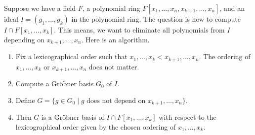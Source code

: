 Suppose we have a field $F$, a polynomial ring $F[x_1,\ldots,x_n, x_{k+1}, \ldots, x_n]$, and an ideal $I = (g_1,\ldots,g_k)$ in the polynomial ring.
The question is how to compute $I\cap F[x_1,\ldots,x_k]$.
This means, we want to eliminate all polynomials from $I$ depending on $x_{k+1},\ldots,x_n$.
Here is an algorithm.
\begin{enumerate}
\item  Fix a lexicographical order such that $x_1,\ldots,x_k < x_{k+1},\ldots,x_n$.
The ordering of $x_1,\ldots,x_k$ or $x_{k+1},\ldots,x_n$ does not matter.

\item Compute a Gr\"obner basis $G_0$ of $I$.

\item Define $G = \{g\in G_0\mid g \text{ does not depend on } x_{k+1},\ldots,x_n\}$.

\item Then $G$ is a Gr\"obner basis of $I\cap F[x_1,\ldots,x_k]$ with respect to the lexicographical order given by the chosen ordering of $x_1,\ldots,x_k$.
\end{enumerate}
